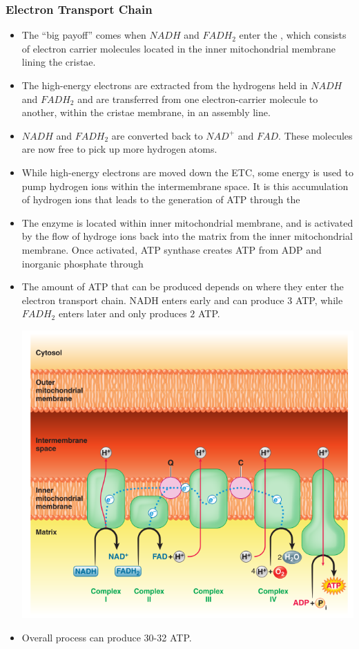 \documentclass{article}
\numberwithin{equation}{section}
\begin{document}
\subsubsection{Electron Transport Chain}
\begin{itemize}
    \item The ``big payoff'' comes when $NADH$ and $FADH_2$ enter the , which consists of electron carrier molecules located in the inner mitochondrial membrane lining the cristae.
    \item The high-energy electrons are extracted from the hydrogens held in $NADH$ and $FADH_2$ and are transferred from one electron-carrier molecule to another, within the cristae membrane, in an assembly line.
    \item $NADH$ and $FADH_2$ are converted back to $NAD^+$ and $FAD$. These molecules are now free to pick up more hydrogen atoms.
    \item While high-energy electrons are moved down the ETC, some energy is used to pump hydrogen ions within the intermembrane space. It is this accumulation of hydrogen ions that leads to the generation of ATP through the 
    \item The enzyme  is located within inner mitochondrial membrane, and is activated by the flow of hydroge ions back into the matrix from the inner mitochondrial membrane. Once activated, ATP synthase creates ATP from ADP and inorganic phosphate through 
    \item The amount of ATP that can be produced depends on where they enter the electron transport chain. NADH enters early and can produce 3 ATP, while $FADH_2$ enters later and only produces $2$ ATP.
    \begin{center}
        \includegraphics[width=0.6\linewidth]{figures/etc.png}
    \end{center}
    \item Overall process can produce 30-32 ATP.
\end{itemize}
\end{document}
